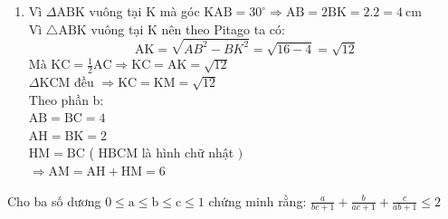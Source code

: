 \begin{bt}
{\begin{enumerate}
			\item Vì $\Delta \mathrm{ABK}$ vuông tại $\mathrm{K}$ mà góc $\mathrm{KAB}=30^{\circ} \Rightarrow \mathrm{AB}=2 \mathrm{BK}=2.2=4 \mathrm{~cm}$\\[5px]
			Vì $\triangle \mathrm{ABK}$ vuông tại $\mathrm{K}$ nên theo Pitago ta có:
			$$
			\mathrm{AK}=\sqrt{A B^2-B K^2}=\sqrt{16-4}=\sqrt{12}
			$$
			Mà $\mathrm{KC}=\frac{1}{2} \mathrm{AC} \Rightarrow \mathrm{KC}=\mathrm{AK}=\sqrt{12}$\\[5px]
			$\Delta \mathrm{KCM}$ đều $\Rightarrow \mathrm{KC}=\mathrm{KM}=\sqrt{12}$\\[5px]
			Theo phần b:\\[5px] $\mathrm{AB}=\mathrm{BC}=4$\\[5px]
			$\mathrm{AH}=\mathrm{BK}=2$\\[5px]
			$\mathrm{HM}=\mathrm{BC}$ ( $\mathrm{HBCM}$ là hình chữ nhật $)$\\[5px]
			$\Rightarrow \mathrm{AM}=\mathrm{AH}+\mathrm{HM}=6$
			
		\end{enumerate}
	}
\end{bt}

\begin{bt}
	Cho ba số dương $0 \leq \mathrm{a} \leq \mathrm{b} \leq \mathrm{c} \leq 1$ chứng minh rằng: $\frac{a}{b c+1}+\frac{b}{a c+1}+\frac{c}{a b+1} \leq 2$
\end{bt}